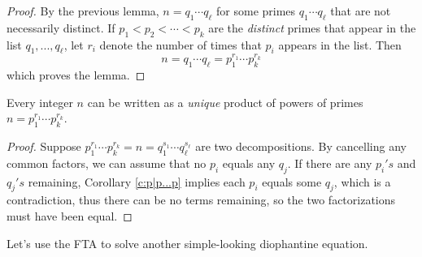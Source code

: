 \documentclass[11pt,dvipsnames]{book}
\numberwithin{figure}{section} %
\numberwithin{table}{section} %
\begin{document}
\begin{proof}
By the previous lemma, $n=q_{1}\cdots q_\ell$ for some primes $q_{1}\cdots q_{\ell}$ that are not necessarily distinct. If $p_{1}<p_{2}<\cdots < p_{k}$ are the {\it distinct} primes that appear in the list $q_{1},...,q_{\ell}$, let $r_{i}$ denote the number of times that $p_{i}$ appears in the list. Then
\[
n=q_{1}\cdots q_{\ell} = p_{1}^{r_{1}}\cdots p_{k}^{r_{k}}\]
which proves the lemma.
\end{proof}

\begin{lemma} Every integer $n$ can be written as a {\it unique} product of powers of primes $n=p_1^{r_{1}}\cdots p_k^{r_{k}}$.
\end{lemma}

  \begin{proof}
  Suppose $p_1^{r_{1}}\cdots p_k^{r_{k}} = n = q_1^{s_{1}}\cdots q_\ell^{s_{\ell}}$ are two decompositions. By cancelling any common factors, we can assume that no $p_i$ equals any $q_j$. If there are  any $p_i's$ and $q_j's$ remaining,  Corollary \ref{c:p|p...p} implies each $p_{i}$ equals some $q_j$, which is a contradiction, thus there can be no terms remaining, so the two factorizations must have been equal.
  \end{proof}

Let's use the FTA to solve another simple-looking diophantine equation.
\end{document}
